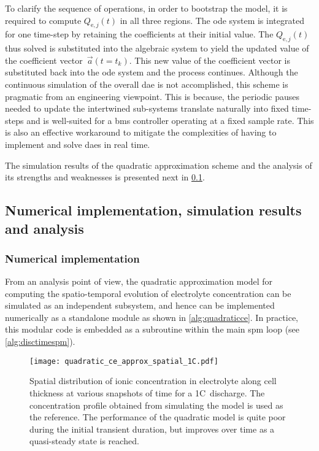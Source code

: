 To  clarify  the sequence  of  operations,  in  order  to bootstrap  the  model,
it  is  required  to  compute  $Q_{\text{e},j}(t)$ in  all  three  regions.  The
\gls{ode} system is  integrated for one time-step by  retaining the coefficients
at  their initial  value.  The $Q_{\text{e},j}(t)$  thus  solved is  substituted
into  the  algebraic system  to  yield  the  updated  value of  the  coefficient
vector~$\vec{a}(t=t_k)$. This new value of the coefficient vector is substituted
back  into  the  \gls{ode}  system  and  the  process  continues.  Although  the
continuous simulation of  the overall \gls{dae} is not accomplished,  this scheme is
pragmatic from an engineering viewpoint. This is because,  the periodic pauses needed to update
the intertwined  sub-systems translate  naturally into  fixed time-steps  and is
well-suited for a \gls{bms} controller operating at a fixed sample rate. This is
also an effective workaround to mitigate the complexities of having to implement
and solve \glspl{dae} in real time.

The   simulation   results   of   the   quadratic   approximation   scheme   and
the   analysis   of   its   strengths   and   weaknesses   is   presented   next
in \cref{subsec:quadraticsimresultsanalysis}.

\subsection{Numerical implementation, simulation results and analysis}\label{subsec:quadraticsimresultsanalysis}

\subsubsection*{Numerical implementation}
From an analysis point of view,  the quadratic approximation model for computing
the  spatio-temporal evolution  of  electrolyte concentration  can be  simulated
as  an  independent subsystem,  and  hence  can  be implemented  numerically  as
a  standalone  module as  shown  in  \cref{alg:quadraticce}. In  practice,  this
modular code  is embedded as  a subroutine within  the main \gls{spm}  loop (see
\cref{alg:disctimespm}).



\begin{figure}[!htb]
    \centering
    \texttt{[image: quadratic\_ce\_approx\_spatial\_1C.pdf]}
    \caption[Spatial distribution of electrolyte concentration for 1C~discharge]{Spatial distribution of ionic concentration in electrolyte along
        cell thickness at various snapshots of time for a 1C~discharge. The
        concentration profile obtained from simulating the 
        model is used as the reference. The performance of the quadratic model
        is quite poor during the initial transient duration, but improves over
    time as a quasi-steady state is reached.}
    \label{fig:spatialionicconc1C}
\end{figure}


